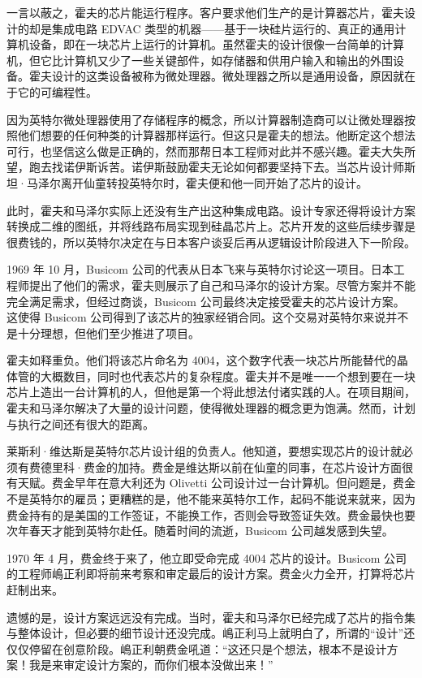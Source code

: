 \documentclass[12pt,UTF8]{ctexbook}
\begin{document}
一言以蔽之，霍夫的芯片能运行程序。客户要求他们生产的是计算器芯片，霍夫设计的却是集成电路 EDVAC 类型的机器——基于一块硅片运行的、真正的通用计算机设备，即在一块芯片上运行的计算机。虽然霍夫的设计很像一台简单的计算机，但它比计算机又少了一些关键部件，如存储器和供用户输入和输出的外围设备。霍夫设计的这类设备被称为微处理器。微处理器之所以是通用设备，原因就在于它的可编程性。

因为英特尔微处理器使用了存储程序的概念，所以计算器制造商可以让微处理器按照他们想要的任何种类的计算器那样运行。但这只是霍夫的想法。他断定这个想法可行，也坚信这么做是正确的，然而那帮日本工程师对此并不感兴趣。霍夫大失所望，跑去找诺伊斯诉苦。诺伊斯鼓励霍夫无论如何都要坚持下去。当芯片设计师斯坦·马泽尔离开仙童转投英特尔时，霍夫便和他一同开始了芯片的设计。

此时，霍夫和马泽尔实际上还没有生产出这种集成电路。设计专家还得将设计方案转换成二维的图纸，并将线路布局实现到硅晶芯片上。芯片开发的这些后续步骤是很费钱的，所以英特尔决定在与日本客户谈妥后再从逻辑设计阶段进入下一阶段。

1969 年 10 月，Busicom 公司的代表从日本飞来与英特尔讨论这一项目。日本工程师提出了他们的需求，霍夫则展示了自己和马泽尔的设计方案。尽管方案并不能完全满足需求，但经过商谈，Busicom 公司最终决定接受霍夫的芯片设计方案。这使得 Busicom 公司得到了该芯片的独家经销合同。这个交易对英特尔来说并不是十分理想，但他们至少推进了项目。

霍夫如释重负。他们将该芯片命名为 4004，这个数字代表一块芯片所能替代的晶体管的大概数目，同时也代表芯片的复杂程度。霍夫并不是唯一一个想到要在一块芯片上造出一台计算机的人，但他是第一个将此想法付诸实践的人。在项目期间，霍夫和马泽尔解决了大量的设计问题，使得微处理器的概念更为饱满。然而，计划与执行之间还有很大的距离。

莱斯利·维达斯是英特尔芯片设计组的负责人。他知道，要想实现芯片的设计就必须有费德里科·费金的加持。费金是维达斯以前在仙童的同事，在芯片设计方面很有天赋。费金早年在意大利还为 Olivetti 公司设计过一台计算机。但问题是，费金不是英特尔的雇员；更糟糕的是，他不能来英特尔工作，起码不能说来就来，因为费金持有的是美国的工作签证，不能换工作，否则会导致签证失效。费金最快也要次年春天才能到英特尔赴任。随着时间的流逝，Busicom 公司越发感到失望。

1970 年 4 月，费金终于来了，他立即受命完成 4004 芯片的设计。Busicom 公司的工程师嶋正利即将前来考察和审定最后的设计方案。费金火力全开，打算将芯片赶制出来。

遗憾的是，设计方案远远没有完成。当时，霍夫和马泽尔已经完成了芯片的指令集与整体设计，但必要的细节设计还没完成。嶋正利马上就明白了，所谓的“设计”还仅仅停留在创意阶段。嶋正利朝费金吼道：“这还只是个想法，根本不是设计方案！我是来审定设计方案的，而你们根本没做出来！”
\end{document}
